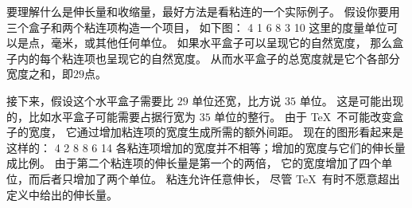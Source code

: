 {{{{{{%
要理解什么是伸长量和收缩量，最好方法是看粘连的一个实际例子。
假设你要用三个盒子和两个粘连项构造一个项目，
如下图：
 {  4 1 6   8 3 10  }
\noindent
这里的度量单位可以是点，毫米，或其他任何单位。
如果水平盒子可以呈现它的自然宽度，
那么盒子内的每个粘连项也呈现它的自然宽度。
从而水平盒子的总宽度就是它个各部分宽度之和，即$29$点。

接下来，假设这个水平盒子需要比 $29$ 单位还宽，比方说 $35$ 单位。
这是可能出现的，比如水平盒子可能需要占据行宽为 $35$ 单位的整行。
由于 \TeX\ 不可能改变盒子的宽度，
它通过增加粘连项的宽度生成所需的额外间距。
现在的图形看起来是这样的：
 {  4 2 8   8 6 14  }
各粘连项增加的宽度并不相等；增加的宽度与它们的伸长量成比例。
由于第二个粘连项的伸长量是第一个的两倍，
它的宽度增加了四个单位，而后者只增加了两个单位。
粘连允许任意伸长，
尽管 \TeX\ 有时不愿意超出定义中给出的伸长量。

}}}}}}
